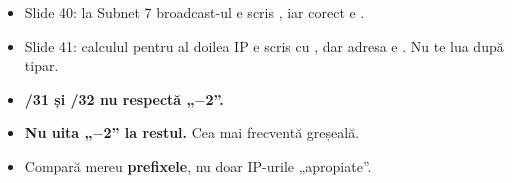 \documentclass[11pt,a4paper]{article}
\begin{document}
\begin{capcana}
\begin{itemize}
  \item Slide 40: la Subnet 7 broadcast-ul e scris , iar corect e \textbf{}.
  \item Slide 41: calculul pentru al doilea IP e scris cu \cod{172.45\ldots}, dar adresa e . Nu te lua după tipar.
  \item \textbf{/31 și /32 nu respectă „$-$2”.}
  \item \textbf{Nu uita „$-$2” la restul.} Cea mai frecventă greșeală.
  \item Compară mereu \textbf{prefixele}, nu doar IP-urile „apropiate”.
\end{itemize}
\end{capcana}
\end{document}

